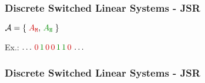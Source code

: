 \begin{frame}
    \frametitle{Discrete Switched Linear Systems - JSR}
    \begin{minipage}{0.59\textwidth}
        \begin{figure}[h]
            \centering
            
        \end{figure}
    \end{minipage}\hfill
    \begin{minipage}{0.39\textwidth}
        \begin{figure}[h]
            \centering
        \end{figure}
    \end{minipage}

    \begin{minipage}{0.59\textwidth}
        \centering
        \large
        $\mathcal{A} = \left\{ \;\textcolor{red!80!black}{A_{\texttt{M}}}, \,\textcolor{lqgcolour}{A_{\texttt{H}}}\; \right\}$
    \end{minipage}\hfill
    \begin{minipage}{0.39\textwidth}
        \centering
        \large
        Ex.: $\dots \,\textcolor{red!80!black}{0} \, \textcolor{lqgcolour}{1} \, \textcolor{red!80!black}{0} \, \textcolor{red!80!black}{0} \, \textcolor{lqgcolour}{1} \, \textcolor{lqgcolour}{1}\, \textcolor{red!80!black}{0} \,\dots$
    \end{minipage}
\end{frame}


\begin{frame}
    \frametitle{Discrete Switched Linear Systems - JSR}
    \begin{figure}[h]
        \centering
        
    \end{figure}
\end{frame}
